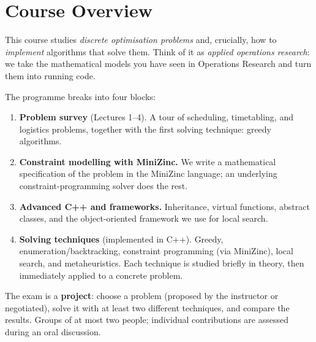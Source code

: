 
\section{Course Overview}
\label{sec:course-overview}

This course studies \emph{discrete optimisation problems}%
and, crucially, how to \emph{implement} algorithms that solve them.
Think of it as \emph{applied operations research}: we take the
mathematical models you have seen in Operations Research and turn
them into running code.

\medskip\noindent
The programme breaks into four blocks:

\begin{enumerate}[leftmargin=2em]
  \item \textbf{Problem survey} (Lectures 1--4).
    A tour of scheduling, timetabling, and logistics problems,
    together with the first solving technique: greedy algorithms.
  \item \textbf{Constraint modelling with MiniZinc.}
    We write a mathematical specification of the problem in the
    MiniZinc language; an underlying constraint-programming
    solver does the rest.
  \item \textbf{Advanced C++ and frameworks.}
    Inheritance, virtual functions, abstract classes, and the
    object-oriented framework we use for local search.
  \item \textbf{Solving techniques} (implemented in C++).
    Greedy, enumeration/backtracking, constraint programming
    (via MiniZinc), local search, and metaheuristics.
    Each technique is studied briefly in theory, then immediately
    applied to a concrete problem.
\end{enumerate}

\begin{remark}
  The exam is a \textbf{project}: choose a problem (proposed by
  the instructor or negotiated), solve it with at least two
  different techniques, and compare the results.
  Groups of at most two people; individual contributions
  are assessed during an oral discussion.
\end{remark}


